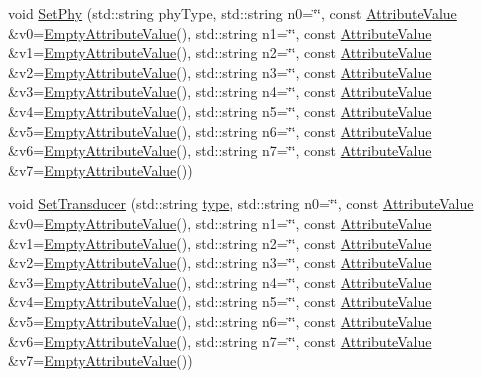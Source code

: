 \begin{DoxyCompactItemize}
\item 
void \hyperlink{classns3_1_1UanHelper_a4435a01bab4cf4d0043b3c2b811ab487}{Set\+Phy} (std\+::string phy\+Type, std\+::string n0=\char`\"{}\char`\"{}, const \hyperlink{classns3_1_1AttributeValue}{Attribute\+Value} \&v0=\hyperlink{classns3_1_1EmptyAttributeValue}{Empty\+Attribute\+Value}(), std\+::string n1=\char`\"{}\char`\"{}, const \hyperlink{classns3_1_1AttributeValue}{Attribute\+Value} \&v1=\hyperlink{classns3_1_1EmptyAttributeValue}{Empty\+Attribute\+Value}(), std\+::string n2=\char`\"{}\char`\"{}, const \hyperlink{classns3_1_1AttributeValue}{Attribute\+Value} \&v2=\hyperlink{classns3_1_1EmptyAttributeValue}{Empty\+Attribute\+Value}(), std\+::string n3=\char`\"{}\char`\"{}, const \hyperlink{classns3_1_1AttributeValue}{Attribute\+Value} \&v3=\hyperlink{classns3_1_1EmptyAttributeValue}{Empty\+Attribute\+Value}(), std\+::string n4=\char`\"{}\char`\"{}, const \hyperlink{classns3_1_1AttributeValue}{Attribute\+Value} \&v4=\hyperlink{classns3_1_1EmptyAttributeValue}{Empty\+Attribute\+Value}(), std\+::string n5=\char`\"{}\char`\"{}, const \hyperlink{classns3_1_1AttributeValue}{Attribute\+Value} \&v5=\hyperlink{classns3_1_1EmptyAttributeValue}{Empty\+Attribute\+Value}(), std\+::string n6=\char`\"{}\char`\"{}, const \hyperlink{classns3_1_1AttributeValue}{Attribute\+Value} \&v6=\hyperlink{classns3_1_1EmptyAttributeValue}{Empty\+Attribute\+Value}(), std\+::string n7=\char`\"{}\char`\"{}, const \hyperlink{classns3_1_1AttributeValue}{Attribute\+Value} \&v7=\hyperlink{classns3_1_1EmptyAttributeValue}{Empty\+Attribute\+Value}())
\item 
void \hyperlink{classns3_1_1UanHelper_ad94f28eb4888f113c762f44a4c55caf4}{Set\+Transducer} (std\+::string \hyperlink{visualizer-ideas_8txt_add98db9e15e2a58cf2b57623e7aa893a}{type}, std\+::string n0=\char`\"{}\char`\"{}, const \hyperlink{classns3_1_1AttributeValue}{Attribute\+Value} \&v0=\hyperlink{classns3_1_1EmptyAttributeValue}{Empty\+Attribute\+Value}(), std\+::string n1=\char`\"{}\char`\"{}, const \hyperlink{classns3_1_1AttributeValue}{Attribute\+Value} \&v1=\hyperlink{classns3_1_1EmptyAttributeValue}{Empty\+Attribute\+Value}(), std\+::string n2=\char`\"{}\char`\"{}, const \hyperlink{classns3_1_1AttributeValue}{Attribute\+Value} \&v2=\hyperlink{classns3_1_1EmptyAttributeValue}{Empty\+Attribute\+Value}(), std\+::string n3=\char`\"{}\char`\"{}, const \hyperlink{classns3_1_1AttributeValue}{Attribute\+Value} \&v3=\hyperlink{classns3_1_1EmptyAttributeValue}{Empty\+Attribute\+Value}(), std\+::string n4=\char`\"{}\char`\"{}, const \hyperlink{classns3_1_1AttributeValue}{Attribute\+Value} \&v4=\hyperlink{classns3_1_1EmptyAttributeValue}{Empty\+Attribute\+Value}(), std\+::string n5=\char`\"{}\char`\"{}, const \hyperlink{classns3_1_1AttributeValue}{Attribute\+Value} \&v5=\hyperlink{classns3_1_1EmptyAttributeValue}{Empty\+Attribute\+Value}(), std\+::string n6=\char`\"{}\char`\"{}, const \hyperlink{classns3_1_1AttributeValue}{Attribute\+Value} \&v6=\hyperlink{classns3_1_1EmptyAttributeValue}{Empty\+Attribute\+Value}(), std\+::string n7=\char`\"{}\char`\"{}, const \hyperlink{classns3_1_1AttributeValue}{Attribute\+Value} \&v7=\hyperlink{classns3_1_1EmptyAttributeValue}{Empty\+Attribute\+Value}())

\end{DoxyCompactItemize}
